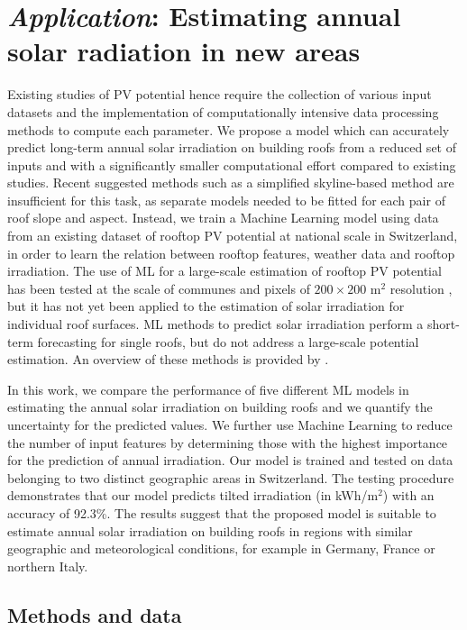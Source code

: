 \section{\textit{Application}: Estimating annual solar radiation in new areas}
\label{solar_application}
Existing studies of PV potential hence require the collection of various input datasets and the implementation of computationally intensive data processing methods to compute each parameter. We propose a model which can accurately predict long-term annual solar irradiation on building roofs from a reduced set of inputs and with a significantly smaller computational effort compared to existing studies. Recent suggested methods such as a simplified skyline-based method \cite{calcabrini_simplified_2019} are insufficient for this task, as separate models needed to be fitted for each pair of roof slope and aspect. Instead, we train a Machine Learning model using data from an existing dataset of rooftop PV potential at national scale in Switzerland, in order to learn the relation between rooftop features, weather data and rooftop irradiation. The use of ML for a large-scale estimation of rooftop PV potential has been tested at the scale of communes \cite{assouline_quantifying_2017} and pixels of $200 \times 200$ m$^2$ resolution \cite{assouline_large-scale_2018}, but it has not yet been applied to the estimation of solar irradiation for individual roof surfaces. 
ML methods to predict solar irradiation perform a short-term forecasting for single roofs, but do not address a large-scale potential estimation. An overview of these methods is provided by \citet{voyant_machine_2017}. 

In this work, we compare the performance of five different ML models in estimating the annual solar irradiation on building roofs and we quantify the uncertainty for the predicted values. We further use Machine Learning to reduce the number of input features by determining those with the highest importance for the prediction of annual irradiation. Our model is trained and tested on data belonging to two distinct geographic areas in Switzerland. The testing procedure demonstrates that our model predicts tilted irradiation (in kWh/m$^2$) with an accuracy of 92.3\%. The results suggest that the proposed model is suitable to estimate annual solar irradiation on building roofs in regions with similar geographic and meteorological conditions, for example in Germany, France or northern Italy.

\subsection{Methods and data}
\label{chile_method}

